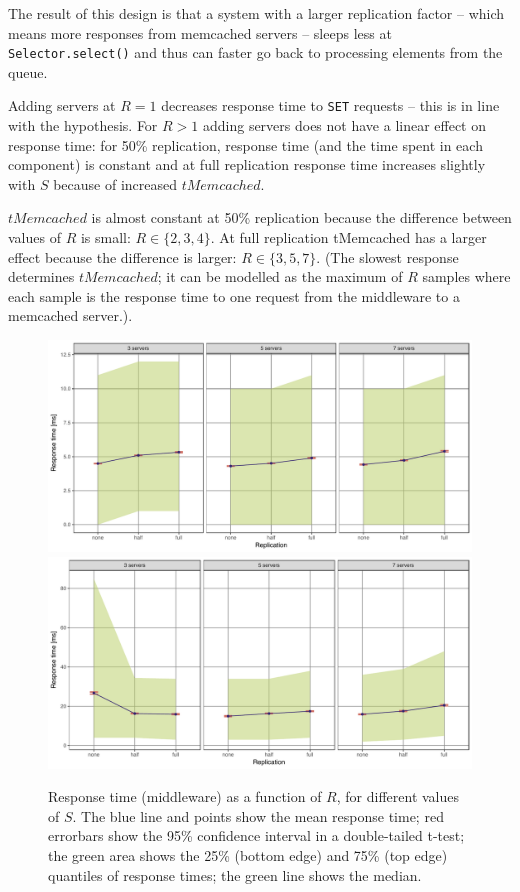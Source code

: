 \documentclass[11pt]{article}
\newcommand{\set}[0]{\texttt{SET}}
\begin{document}
The result of this design is that a system with a larger replication factor -- which means more responses from memcached servers -- sleeps less at \verb+Selector.select()+ and thus can faster go back to processing elements from the queue.

Adding servers at $R=1$ decreases response time to \set{} requests -- this is in line with the hypothesis. For $R>1$ adding servers does not have a linear effect on response time: for 50\% replication, response time (and the time spent in each component) is constant and at full replication response time increases slightly with $S$ because of increased $tMemcached$.

$tMemcached$ is almost constant at 50\% replication because the difference between values of $R$ is small: $R \in \{2,3,4\}$. At full replication tMemcached has a larger effect because the difference is larger: $R \in \{3,5,7\}$. (The slowest response determines $tMemcached$; it can be modelled as the maximum of $R$ samples where each sample is the response time to one request from the middleware to a memcached server.).

\begin{figure}[h]
\centering
\includegraphics[width=\textwidth]{../results/replication/graphs/response_time_vs_replication_get.pdf}
\includegraphics[width=\textwidth]{../results/replication/graphs/response_time_vs_replication_set.pdf}
\caption{Response time (middleware) as a function of $R$, for different values of $S$. The blue line and points show the mean response time; red errorbars show the 95\% confidence interval in a double-tailed t-test; the green area shows the 25\% (bottom edge) and 75\% (top edge) quantiles of response times; the green line shows the median.}
\label{fig:exp2:res:replication}
\end{figure}
\end{document}
